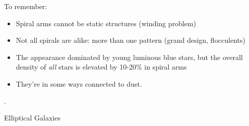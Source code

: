 \documentclass[letterpaper,landscape]{slides}
\begin{document}



\begin{slide}
\begin{center}
{\color{red} To remember:}
\end{center}

\begin{itemize}
\item
Spiral arms cannot be static structures (winding problem)
\item
Not all spirals are alike: more than one pattern (grand design, flocculents)
\item 
The appearance dominated by young luminous blue stars, but
the overall density of {\it all} stars is elevated by
10-20\% in spiral arms 
\item
They're in some ways connected to dust.
\end{itemize}

\vfill
\end{slide}



\begin{slide}
	.
	\begin{center}
		\vskip 2.5in
		{\large \color{red} 
			Elliptical Galaxies}
	\end{center}
	
	\vfill
\end{slide}



\end{document}
